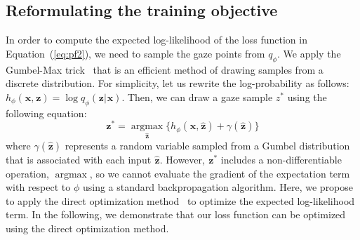 \documentclass[10pt,twocolumn,letterpaper]{article}
\newcommand{\varx}{\mathbf{\mspace{1mu}x}}
\newcommand{\varz}{\mathbf{\mspace{1mu}z}}
\DeclareMathOperator*{\argmax}{argmax}
\begin{document}
\subsection{Reformulating the training objective} \label{subsec:objective}
In order to compute the expected log-likelihood of the loss function in Equation~(\ref{eq:pf2}), we need to sample the gaze points from $q_{\phi}$. We apply the Gumbel-Max trick~\cite{maddison2014sampling} that is an efficient method of drawing samples from a discrete distribution. For simplicity, let us rewrite the log-probability as follows: $h_{\phi}(\varx, \varz)=\log q_{\phi}(\varz|\varx)$. Then, we can draw a gaze sample $z^*$ using the following equation:
\begin{equation}
\label{eq:opt1}
\varz^*=\argmax \limits_{\hat{\varz}} \{ h_{\phi}(\varx,\hat{\varz}) +\gamma(\hat{\varz})\}
\end{equation}
where $\gamma(\hat{\varz})$ represents a random variable sampled from a Gumbel distribution that is associated with each input $\hat{\varz}$. However, $\varz^*$ includes a non-differentiable operation, $\argmax$, so we cannot evaluate the gradient of the expectation term with respect to $\phi$ using a standard backpropagation algorithm. Here, we propose to apply the direct optimization method~\cite{lorberbom2018direct} to optimize the expected log-likelihood term. In the following, we demonstrate that our loss function can be optimized using the direct optimization method.
\end{document}
